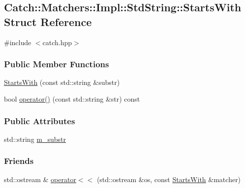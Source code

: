 \hypertarget{structCatch_1_1Matchers_1_1Impl_1_1StdString_1_1StartsWith}{\subsection{Catch\-:\-:Matchers\-:\-:Impl\-:\-:Std\-String\-:\-:Starts\-With Struct Reference}
\label{structCatch_1_1Matchers_1_1Impl_1_1StdString_1_1StartsWith}
}


{\ttfamily \#include $<$catch.\-hpp$>$}

\subsubsection*{Public Member Functions}
\begin{DoxyCompactItemize}
\item 
\hyperlink{structCatch_1_1Matchers_1_1Impl_1_1StdString_1_1StartsWith_a8a5d4182fde040c417afae3559a74869}{Starts\-With} (const std\-::string \&substr)
\item 
bool \hyperlink{structCatch_1_1Matchers_1_1Impl_1_1StdString_1_1StartsWith_adcaf65cd080610d4ebd9a7ccbff01f1c}{operator()} (const std\-::string \&str) const 
\end{DoxyCompactItemize}
\subsubsection*{Public Attributes}
\begin{DoxyCompactItemize}
\item 
std\-::string \hyperlink{structCatch_1_1Matchers_1_1Impl_1_1StdString_1_1StartsWith_aebcdf35b98fd0097d9e9113b9219fcd1}{m\-\_\-substr}
\end{DoxyCompactItemize}
\subsubsection*{Friends}
\begin{DoxyCompactItemize}
\item 
std\-::ostream \& \hyperlink{structCatch_1_1Matchers_1_1Impl_1_1StdString_1_1StartsWith_a1a3b7c561d8d8fd405c090274e690ca6}{operator$<$$<$} (std\-::ostream \&os, const \hyperlink{structCatch_1_1Matchers_1_1Impl_1_1StdString_1_1StartsWith}{Starts\-With} \&matcher)
\end{DoxyCompactItemize}


